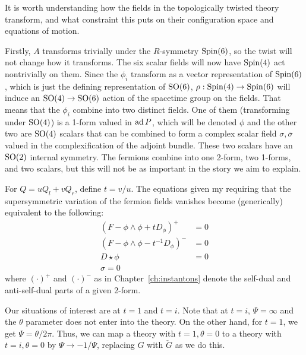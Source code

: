 	It is worth understanding how the fields in the topologically twisted theory transform, and what constraint this puts on their configuration space and equations of motion. 

	Firstly, $A$ transforms trivially under the $R$-symmetry $\mathrm{Spin}(6)$, so the twist will not change how it transforms. The six scalar fields will now have $\mathrm{Spin}(4)$ act nontrivially on them. Since the $\phi_i$ transform as a vector representation of $\mathrm{Spin}(6)$, which is just the defining representation of $\mathrm{SO}(6)$, $\rho: \mathrm{Spin}(4) \to \mathrm{Spin}(6)$ will induce an $\mathrm{SO}(4) \to \mathrm{SO}(6)$ action of the spacetime group on the fields. That means that the $\phi_i$ combine into two distinct fields. One of them (transforming under $\mathrm{SO}(4)$) is a 1-form valued in $\mathrm{ad}\, P$, which will be denoted $\phi$ and the other two are $\mathrm{SO}(4)$ scalars that can be combined to form a complex scalar field $\sigma, \overline \sigma$ valued in the complexification of the adjoint bundle. These two scalars have an $\mathrm{SO}(2)$ internal symmetry. The fermions combine into one 2-form, two 1-forms, and two scalars, but this will not be as important in the story we aim to explain.
	
	For $Q = u Q_l + v Q_r$, define $t = v/u$. The equations given my requiring that the supersymmetric variation of the fermion fields vanishes become (generically) equivalent to the following:
	\begin{equation}
		\begin{aligned}
			(F - \phi \wedge \phi + t D_\phi)^+ &= 0\\
			(F - \phi \wedge \phi - t^{-1} D_\phi)^- &= 0\\
			D \star \phi &= 0\\
			\sigma = 0
		\end{aligned}
	\end{equation}
	where $(\cdot)^+$ and $(\cdot)^-$ as in Chapter~\ref{ch:instantons} denote the self-dual and anti-self-dual parts of a given 2-form. 
	
	Our situations of interest are at $t=1$ and $t=i$. Note that at $t = i$, $\Psi = \infty$ and the $\theta$ parameter does not enter into the theory. On the other hand, for $t = 1$, we get $\Psi = \theta/2\pi$. Thus, we can map a theory with $t=1, \theta=0$ to a theory with $t = i, \theta = 0$ by $\Psi \to -1/\Psi$, replacing $G$ with $\check G$ as we do this.
	
